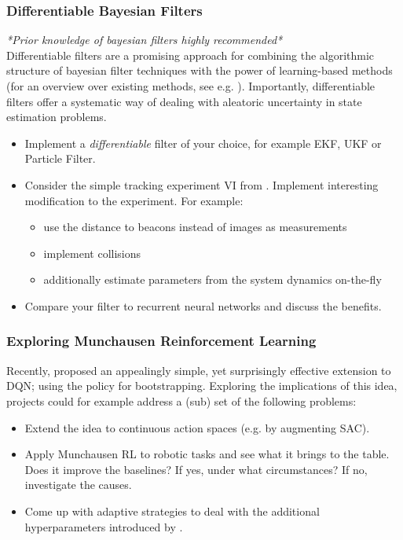 \documentclass[a4paper]{article}
\begin{document}
\subsubsection{Differentiable Bayesian Filters}
\textit{*Prior knowledge of bayesian filters highly recommended*}\\
Differentiable filters are a promising approach for combining the algorithmic structure of bayesian filter techniques with the power of learning-based methods (for an overview over existing methods, see e.g. \cite{kloss2021train}). Importantly, differentiable filters offer a systematic way of dealing with aleatoric uncertainty in state estimation problems.
\begin{itemize}
  \item Implement a \textit{differentiable} filter of your choice, for example EKF, UKF or Particle Filter.
  \item Consider the simple tracking experiment VI from \cite{kloss2021train}. Implement interesting modification to the experiment. For example:
        \begin{itemize}
          \item use the distance to beacons instead of images as measurements
          \item implement collisions
          \item additionally estimate parameters from the system dynamics on-the-fly
        \end{itemize}
  \item Compare your filter to recurrent neural networks and discuss the benefits.
\end{itemize}

\subsubsection{Exploring Munchausen Reinforcement Learning}
Recently, \cite{vieillard2020munchausen} proposed an appealingly simple, yet surprisingly effective extension to DQN; using the policy for bootstrapping. Exploring the implications of this idea, projects could for example address a (sub) set of the following problems:

\begin{itemize}
  \item Extend the idea to continuous action spaces (e.g. by augmenting SAC).
  \item Apply Munchausen RL to robotic tasks and see what it brings to the table. Does it improve the baselines? If yes, under what circumstances? If no, investigate the causes.
  \item Come up with adaptive strategies to deal with the additional hyperparameters introduced by \cite{vieillard2020munchausen}.
\end{itemize}
\end{document}
